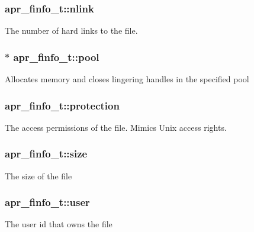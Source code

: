 \subsubsection[{\texorpdfstring{nlink}{nlink}}]{ apr\+\_\+finfo\+\_\+t\+::nlink}\hypertarget{structapr__finfo__t_a98598f28735d75aa0c1994efc825e6d9}{}\label{structapr__finfo__t_a98598f28735d75aa0c1994efc825e6d9}
The number of hard links to the file. 
\subsubsection[{\texorpdfstring{pool}{pool}}]{$\ast$ apr\+\_\+finfo\+\_\+t\+::pool}\hypertarget{structapr__finfo__t_a71496f86b5489c87e58e9c03fe468fb8}{}\label{structapr__finfo__t_a71496f86b5489c87e58e9c03fe468fb8}
Allocates memory and closes lingering handles in the specified pool 
\subsubsection[{\texorpdfstring{protection}{protection}}]{ apr\+\_\+finfo\+\_\+t\+::protection}\hypertarget{structapr__finfo__t_a7c09d73ad1957e2c0e6c6b77d94e90ab}{}\label{structapr__finfo__t_a7c09d73ad1957e2c0e6c6b77d94e90ab}
The access permissions of the file. Mimics Unix access rights. 
\subsubsection[{\texorpdfstring{size}{size}}]{ apr\+\_\+finfo\+\_\+t\+::size}\hypertarget{structapr__finfo__t_a3e47a673c5b82a25a783a732dee6f946}{}\label{structapr__finfo__t_a3e47a673c5b82a25a783a732dee6f946}
The size of the file 
\subsubsection[{\texorpdfstring{user}{user}}]{ apr\+\_\+finfo\+\_\+t\+::user}\hypertarget{structapr__finfo__t_ab79d14bd50f50662d29ad433166c4bc5}{}\label{structapr__finfo__t_ab79d14bd50f50662d29ad433166c4bc5}
The user id that owns the file 
